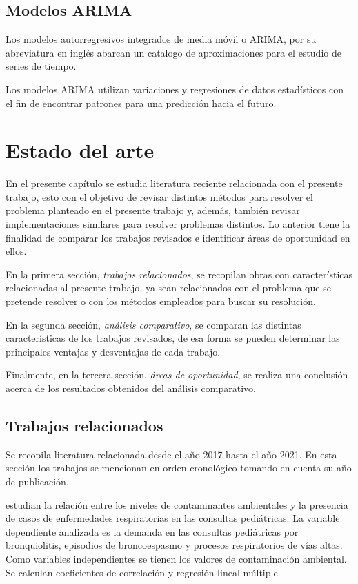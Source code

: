 \section{Modelos ARIMA}
Los modelos autorregresivos integrados de media móvil o ARIMA, por su abreviatura en inglés abarcan un catalogo de aproximaciones para el estudio de series de tiempo. 

Los modelos ARIMA utilizan variaciones y regresiones de datos estadísticos con el fin de encontrar patrones para una predicción hacia el futuro. 

\chapter{Estado del arte}
En el presente capítulo se estudia literatura reciente relacionada con el presente trabajo, esto con el objetivo de revisar distintos métodos para resolver el problema planteado en el presente trabajo y, además, también revisar implementaciones similares para resolver problemas distintos. Lo anterior tiene la finalidad de comparar los trabajos revisados e identificar áreas de oportunidad en ellos.

En la primera sección, \emph{trabajos relacionados}, se recopilan obras con características relacionadas al presente trabajo, ya sean relacionados con el problema que se pretende resolver o con los métodos empleados para buscar su resolución.

En la segunda sección, \emph{análisis comparativo}, se comparan las distintas características de los trabajos revisados, de esa forma se pueden determinar las principales ventajas y desventajas de cada trabajo. 

Finalmente, en la tercera sección, \emph{áreas de oportunidad}, se realiza una conclusión acerca de los resultados obtenidos del análisis comparativo.

\clearpage
\section{Trabajos relacionados}
Se recopila literatura relacionada desde el año 2017 hasta el año 2021. En esta sección los trabajos se mencionan en orden cronológico tomando en cuenta su año de publicación.

\citet{r12} estudian la relación entre los niveles de contaminantes ambientales y la presencia de casos de enfermedades respiratorias en las consultas pediátricas. La variable dependiente analizada es la demanda en las consultas pediátricas por bronquiolitis, episodios de broncoespasmo y procesos respiratorios de vías altas. Como variables independientes se tienen los valores de contaminación ambiental. Se calculan coeficientes de correlación y regresión lineal múltiple.

